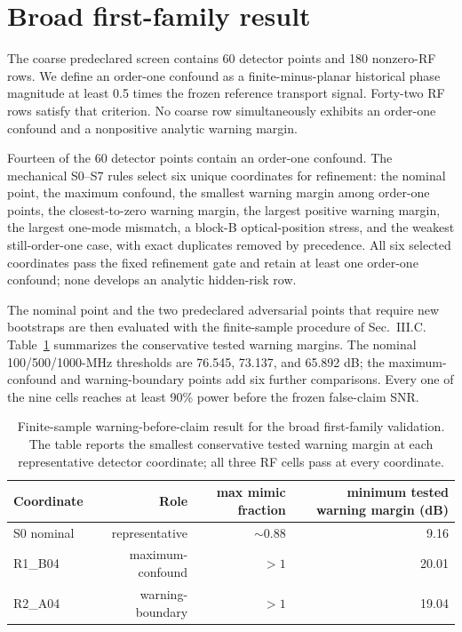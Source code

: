 \documentclass[11pt]{article}
\begin{document}
\section{Broad first-family result}

The coarse predeclared screen contains 60 detector points and 180 nonzero-RF rows. We define an order-one confound as a finite-minus-planar historical phase magnitude at least 0.5 times the frozen reference transport signal. Forty-two RF rows satisfy that criterion. No coarse row simultaneously exhibits an order-one confound and a nonpositive analytic warning margin.

Fourteen of the 60 detector points contain an order-one confound. The mechanical S0--S7 rules select six unique coordinates for refinement: the nominal point, the maximum confound, the smallest warning margin among order-one points, the closest-to-zero warning margin, the largest positive warning margin, the largest one-mode mismatch, a block-B optical-position stress, and the weakest still-order-one case, with exact duplicates removed by precedence. All six selected coordinates pass the fixed refinement gate and retain at least one order-one confound; none develops an analytic hidden-risk row.

The nominal point and the two predeclared adversarial points that require new bootstraps are then evaluated with the finite-sample procedure of Sec.~III.C. Table~\ref{tab:firstfamily} summarizes the conservative tested warning margins. The nominal 100/500/1000-MHz thresholds are 76.545, 73.137, and 65.892 dB; the maximum-confound and warning-boundary points add six further comparisons. Every one of the nine cells reaches at least 90\% power before the frozen false-claim SNR.

\begin{table}[H]
\centering
\caption{Finite-sample warning-before-claim result for the broad first-family validation. The table reports the smallest conservative tested warning margin at each representative detector coordinate; all three RF cells pass at every coordinate.}
\label{tab:firstfamily}
\begin{tabular}{lrrr}
\toprule
Coordinate & Role & max mimic fraction & minimum tested warning margin (dB)\\
\midrule
S0 nominal & representative & $\sim0.88$ & 9.16\\
R1\_B04 & maximum-confound & $>1$ & 20.01\\
R2\_A04 & warning-boundary & $>1$ & 19.04\\
\bottomrule
\end{tabular}
\end{table}
\end{document}

